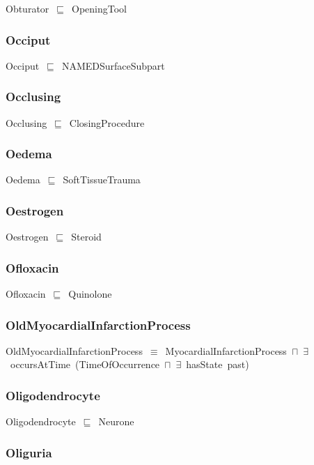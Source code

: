 \documentclass{article}
\begin{document}
Obturator~\ensuremath{\sqsubseteq}~OpeningTool~

\subsubsection*{Occiput}

Occiput~\ensuremath{\sqsubseteq}~NAMEDSurfaceSubpart~

\subsubsection*{Occlusing}

Occlusing~\ensuremath{\sqsubseteq}~ClosingProcedure~

\subsubsection*{Oedema}

Oedema~\ensuremath{\sqsubseteq}~SoftTissueTrauma~

\subsubsection*{Oestrogen}

Oestrogen~\ensuremath{\sqsubseteq}~Steroid~

\subsubsection*{Ofloxacin}

Ofloxacin~\ensuremath{\sqsubseteq}~Quinolone~

\subsubsection*{OldMyocardialInfarctionProcess}

OldMyocardialInfarctionProcess~\ensuremath{\equiv}~MyocardialInfarctionProcess~\ensuremath{\sqcap}~\ensuremath{\exists}~occursAtTime~(TimeOfOccurrence~\ensuremath{\sqcap}~\ensuremath{\exists}~hasState~past)

\subsubsection*{Oligodendrocyte}

Oligodendrocyte~\ensuremath{\sqsubseteq}~Neurone~

\subsubsection*{Oliguria}
\end{document}
